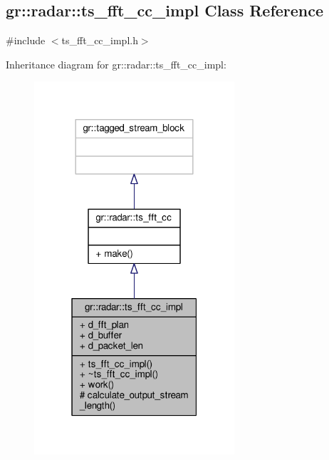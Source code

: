 \subsection{gr\+:\+:radar\+:\+:ts\+\_\+fft\+\_\+cc\+\_\+impl Class Reference}
\label{classgr_1_1radar_1_1ts__fft__cc__impl}


{\ttfamily \#include $<$ts\+\_\+fft\+\_\+cc\+\_\+impl.\+h$>$}



Inheritance diagram for gr\+:\+:radar\+:\+:ts\+\_\+fft\+\_\+cc\+\_\+impl\+:
\nopagebreak
\begin{figure}[H]
\begin{center}
\leavevmode
\includegraphics[width=211pt]{df/d18/classgr_1_1radar_1_1ts__fft__cc__impl__inherit__graph}
\end{center}
\end{figure}


